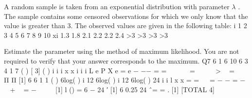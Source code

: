 \documentclass[a4paper,12pt]{article}
\begin{document}
A random sample is taken from an exponential distribution with parameter $\lambda$ . The
sample contains some censored observations for which we only know that the value is
greater than 3. The observed values are given in the following table:
  i 1 2 3 4 5 6 7 8 9 10
xi 1.3 1.8 2.1 2.2 2.2 2.4 >3 >3 >3 >3

Estimate the parameter \lambda using the method of maximum likelihood. You are not required to verify that your answer corresponds to the maximum. 
Q7
6
1
6 10
6 3 4
1 7
( ) [ 3] ( )
i
i i
x
x
i
i i
L e P X e = e
−\lambda
−\lambda − \lambda
= =
      
\lambda =  \lambda   >  = \lambda
  
Π Π [1]
6 6
1 1
( ) 6log( ) i 12 6log( ) i 12 6log( ) 24
i i
l x x
= =
   
\lambda = \lambda − \lambda − \lambda = \lambda − \lambda +  = \lambda − \lambda
 
  [1]
l (\lambda) = 6 − 24
\lambda
′ [1]
6 0.25
24
ˆ\lambda = = . [1]
[TOTAL 4]
\newpage
\end{document}
